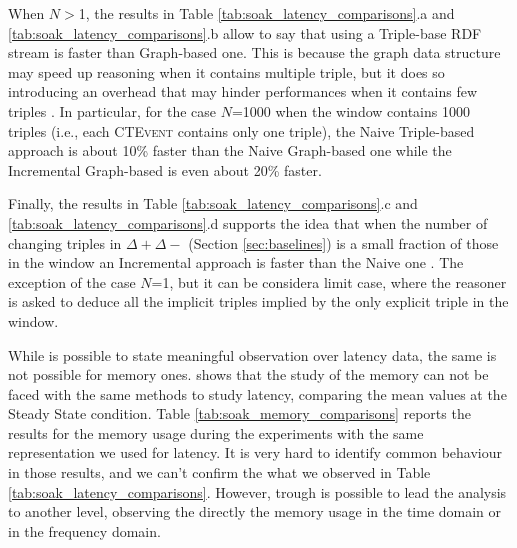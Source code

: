 When $N>$1, the results in Table \ref{tab:soak_latency_comparisons}.a and \ref{tab:soak_latency_comparisons}.b allow to say that using a Triple-base RDF stream is faster than Graph-based one. This is because the graph data structure may speed up reasoning when it contains multiple triple, but it does so introducing an overhead that may hinder performances when it contains few triples \cite{DBLP:conf/semweb/BalduiniVDTPC13}.   In particular, for the case $N$=1000 when the window contains 1000 triples (i.e., each \textsc{CTEvent} contains only one triple),  the Naive Triple-based approach is about 10\% faster  than the Naive Graph-based one while the Incremental Graph-based is even about 20\% faster.

Finally, the results in Table \ref{tab:soak_latency_comparisons}.c and \ref{tab:soak_latency_comparisons}.d supports the idea that when the number of changing triples in $\Delta+ \Delta-$ (Section \ref{sec:baselines}) is a small fraction of those in the window an Incremental approach is faster than the Naive one \cite{DellAglio2014,DBLP:conf/cikm/RenP11,DBLP:conf/semweb/UrbaniMJHB13}. The exception of the case $N$=1, but it can be considera limit case, where the reasoner is asked to deduce all the implicit triples implied by the only explicit triple in the window.  

While is possible to state meaningful observation over latency data, the same is not possible for memory ones. \name shows that the study of the memory can not be faced with the same methods to study latency, comparing the mean values at the Steady State condition. Table \ref{tab:soak_memory_comparisons} reports the  results for the memory usage during the experiments with the same representation we used for latency.  It is very hard to identify common behaviour in those results, and we can't confirm the what we observed in Table \ref{tab:soak_latency_comparisons}. However, trough \name is possible to lead the analysis to another level, observing the directly the memory usage in the time domain or in the frequency domain. 


